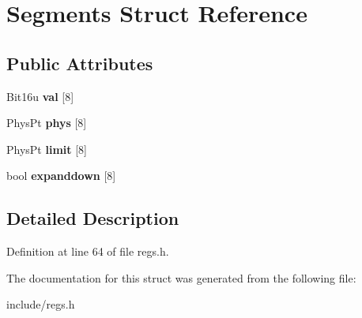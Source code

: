 \hypertarget{structSegments}{\section{Segments Struct Reference}
\label{structSegments}
}
\subsection*{Public Attributes}
\begin{DoxyCompactItemize}
\item 
\hypertarget{structSegments_a562da55bd68fe2b6868e05d508d0132a}{Bit16u {\bfseries val} \mbox{[}8\mbox{]}}\label{structSegments_a562da55bd68fe2b6868e05d508d0132a}

\item 
\hypertarget{structSegments_a4f46d33e4b39db4d90dc08f60977827f}{Phys\-Pt {\bfseries phys} \mbox{[}8\mbox{]}}\label{structSegments_a4f46d33e4b39db4d90dc08f60977827f}

\item 
\hypertarget{structSegments_ade01cae0e4924f3e935edf9b85e5871c}{Phys\-Pt {\bfseries limit} \mbox{[}8\mbox{]}}\label{structSegments_ade01cae0e4924f3e935edf9b85e5871c}

\item 
\hypertarget{structSegments_ab1911ac9e65d10c97daebad5e709a6d2}{bool {\bfseries expanddown} \mbox{[}8\mbox{]}}\label{structSegments_ab1911ac9e65d10c97daebad5e709a6d2}

\end{DoxyCompactItemize}


\subsection{Detailed Description}


Definition at line 64 of file regs.\-h.



The documentation for this struct was generated from the following file\-:\begin{DoxyCompactItemize}
\item 
include/regs.\-h\end{DoxyCompactItemize}
